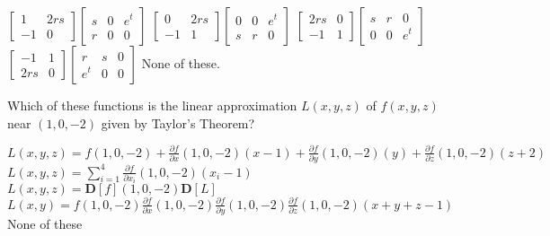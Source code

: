 \documentclass[12pt]{exam}
\newcommand{\vect}[1]{\ensuremath{\mathbf{#1}}}
\newcommand{\<}{\langle}
\renewcommand{\>}{\rangle}
\newcommand{\p}{\partial}
\begin{document}
\begin{questions}
\begin{checkboxes}
\choice \(
  \left[
  \begin{matrix}
     1 & 2rs\\
     -1 & 0
  \end{matrix}
  \right]
  \left[
  \begin{matrix}
     s & 0 & e^t\\
     r & 0 & 0
  \end{matrix}
  \right]
\)
\choice \(
  \left[
  \begin{matrix}
     0 & 2rs\\
     -1 & 1
  \end{matrix}
  \right]
  \left[
  \begin{matrix}
     0 & 0 & e^t\\
     s & r & 0
  \end{matrix}
  \right]
\)
\choice \(
  \left[
  \begin{matrix}
     2rs & 0\\
     -1 & 1
  \end{matrix}
  \right]
  \left[
  \begin{matrix}
     s & r & 0\\
     0 & 0 & e^t
  \end{matrix}
  \right]
\)
\choice \(
  \left[
  \begin{matrix}
     -1 & 1\\
     2rs & 0
  \end{matrix}
  \right]
  \left[
  \begin{matrix}
     r & s & 0\\
     e^t & 0 & 0
  \end{matrix}
  \right]
\)
\choice None of these.
\end{checkboxes}

\vfill

\question[20]
Which of these functions is the linear approximation \(L(x,y,z)\) of
\(f(x,y,z)\) near \((1,0,-2)\) given by Taylor's Theorem?
\begin{checkboxes}
  \choice \(L(x,y,z) = f(1,0,-2)+\frac{\p f}{\p x}(1,0,-2)(x-1)+\frac{\p f}{\p y}(1,0,-2)(y)+\frac{\p f}{\p z}(1,0,-2)(z+2)\)
  \choice \(L(x,y,z) = \sum_{i=1}^4\frac{\p f}{\p x_i}(1,0,-2)(x_i-1)\)
  \choice \(L(x,y,z) = \vect D[f](1,0,-2)\vect D[L]\)
  \choice \(L(x,y) = f(1,0,-2)\frac{\p f}{\p x}(1,0,-2)\frac{\p f}{\p y}(1,0,-2)\frac{\p f}{\p z}(1,0,-2)(x+y+z-1)\)
  \choice None of these
\end{checkboxes}

\vfill
\newpage


\end{questions}
\end{document}
